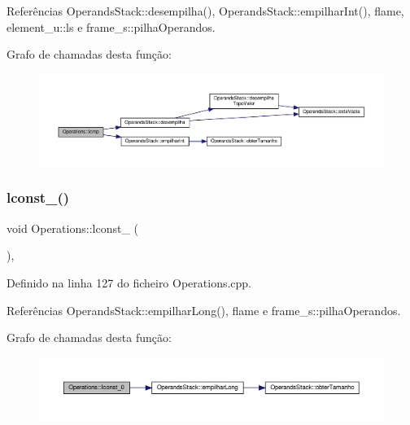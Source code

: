 Referências Operands\+Stack\+::desempilha(), Operands\+Stack\+::empilhar\+Int(), flame, element\+\_\+u\+::ls e frame\+\_\+s\+::pilha\+Operandos.

Grafo de chamadas desta função\+:
\nopagebreak
\begin{figure}[H]
\begin{center}
\leavevmode
\includegraphics[width=350pt]{classOperations_a7ad4ad0e417096686b55dde9142b830a_cgraph}
\end{center}
\end{figure}
\mbox{\label{classOperations_a89586a819a6e67c2168d7d6e43f087ef}} 
\subsubsection{\texorpdfstring{lconst\+\_()}{lconst\_0()}}
{\footnotesize\ttfamily void Operations\+::lconst\+\_ (\begin{DoxyParamCaption}{ }\end{DoxyParamCaption})\hspace{0.3cm}{\ttfamily [static]}, {\ttfamily [private]}}



Definido na linha 127 do ficheiro Operations.\+cpp.



Referências Operands\+Stack\+::empilhar\+Long(), flame e frame\+\_\+s\+::pilha\+Operandos.

Grafo de chamadas desta função\+:
\nopagebreak
\begin{figure}[H]
\begin{center}
\leavevmode
\includegraphics[width=350pt]{classOperations_a89586a819a6e67c2168d7d6e43f087ef_cgraph}
\end{center}
\end{figure}
\mbox{\label{classOperations_ae6c6a8e3d75dec712e534434f85909ce}} 
